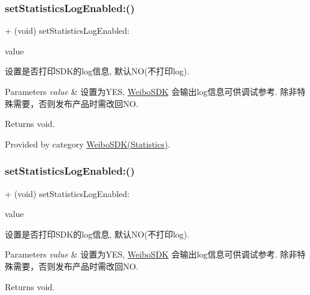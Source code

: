 \subsubsection{\texorpdfstring{set\+Statistics\+Log\+Enabled\+:()}{setStatisticsLogEnabled:()}\hspace{0.1cm}{\footnotesize\ttfamily [2/3]}}
{\footnotesize\ttfamily + (void) set\+Statistics\+Log\+Enabled\+: \begin{DoxyParamCaption}\item[{(B\+O\+OL)}]{value }\end{DoxyParamCaption}}

设置是否打印\+S\+D\+K的log信息, 默认\+NO(不打印log). 
\begin{DoxyParams}{Parameters}
{\em value} & 设置为\+Y\+ES, \mbox{\hyperlink{interface_weibo_s_d_k}{Weibo\+S\+DK}} 会输出log信息可供调试参考. 除非特殊需要，否则发布产品时需改回\+NO. \\
\hline
\end{DoxyParams}
\begin{DoxyReturn}{Returns}
void. 
\end{DoxyReturn}


Provided by category \mbox{\hyperlink{category_weibo_s_d_k_07_statistics_08_a2e009db32a6d059ff53e35ac211d57f9}{Weibo\+S\+D\+K(\+Statistics)}}.

\mbox{\label{interface_weibo_s_d_k_a2e009db32a6d059ff53e35ac211d57f9}} 
\subsubsection{\texorpdfstring{set\+Statistics\+Log\+Enabled\+:()}{setStatisticsLogEnabled:()}\hspace{0.1cm}{\footnotesize\ttfamily [3/3]}}
{\footnotesize\ttfamily + (void) set\+Statistics\+Log\+Enabled\+: \begin{DoxyParamCaption}\item[{(B\+O\+OL)}]{value }\end{DoxyParamCaption}}

设置是否打印\+S\+D\+K的log信息, 默认\+NO(不打印log). 
\begin{DoxyParams}{Parameters}
{\em value} & 设置为\+Y\+ES, \mbox{\hyperlink{interface_weibo_s_d_k}{Weibo\+S\+DK}} 会输出log信息可供调试参考. 除非特殊需要，否则发布产品时需改回\+NO. \\
\hline
\end{DoxyParams}
\begin{DoxyReturn}{Returns}
void. 
\end{DoxyReturn}


